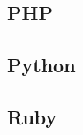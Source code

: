 \documentclass{KodeBook}
\begin{document}
\subsection{PHP}



\subsection{Python}



\subsection{Ruby}




\ifx\wholebook\relax\else
% 
% 
	
\end{document}
